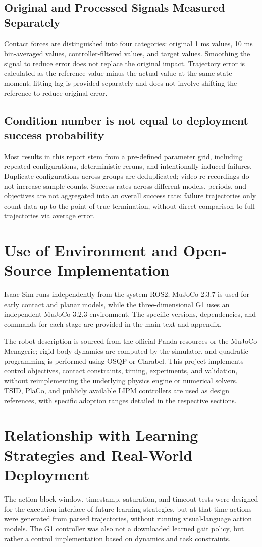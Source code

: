 \subsection{Original and Processed Signals Measured Separately}
Contact forces are distinguished into four categories: original 1 ms values, 10 ms bin-averaged values, controller-filtered values, and target values. Smoothing the signal to reduce error does not replace the original impact. Trajectory error is calculated as the reference value minus the actual value at the same state moment; fitting lag is provided separately and does not involve shifting the reference to reduce original error.
\subsection{Condition number is not equal to deployment success probability}
Most results in this report stem from a pre-defined parameter grid, including repeated configurations, deterministic reruns, and intentionally induced failures. Duplicate configurations across groups are deduplicated; video re-recordings do not increase sample counts. Success rates across different models, periods, and objectives are not aggregated into an overall success rate; failure trajectories only count data up to the point of true termination, without direct comparison to full trajectories via average error.
\section{Use of Environment and Open-Source Implementation}
Isaac Sim runs independently from the system ROS2; MuJoCo 2.3.7 is used for early contact and planar models, while the three-dimensional G1 uses an independent MuJoCo 3.2.3 environment. The specific versions, dependencies, and commands for each stage are provided in the main text and appendix.

The robot description is sourced from the official Panda resources or the MuJoCo Menagerie; rigid-body dynamics are computed by the simulator, and quadratic programming is performed using OSQP or Clarabel. This project implements control objectives, contact constraints, timing, experiments, and validation, without reimplementing the underlying physics engine or numerical solvers. TSID, PlaCo, and publicly available LIPM controllers are used as design references, with specific adoption ranges detailed in the respective sections.
\section{Relationship with Learning Strategies and Real-World Deployment}
The action block window, timestamp, saturation, and timeout tests were designed for the execution interface of future learning strategies, but at that time actions were generated from parsed trajectories, without running visual-language action models. The G1 controller was also not a downloaded learned gait policy, but rather a control implementation based on dynamics and task constraints.

